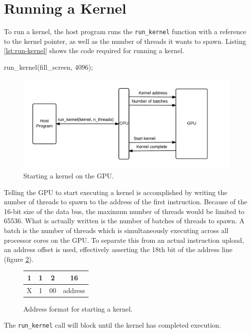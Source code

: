 \section{Running a Kernel}
To run a kernel, the host program runs the \verb/run_kernel/ function with a reference to the kernel pointer, as well as the number of threads it wants to spawn.
Listing \ref{lst:run-kernel} shows the code required for running a kernel.

\begin{c-code}[caption=Running a kernel, label=lst:run-kernel]
run_kernel(fill_screen, 4096);
\end{c-code}

\begin{figure}[H]
    \centering
    \includegraphics[width=\textwidth]{../cpu/diagrams/running_a_kernel.png}
    \caption{Starting a kernel on the GPU.}
    \label{fig:running_a_kernel}
\end{figure}

Telling the GPU to start executing a kernel is accomplished by writing the number of threads to spawn to the address of the first instruction.
Because of the 16-bit size of the data bus, the maximum number of threads would be limited to 65536.
What is actually written is the number of batches of threads to spawn.
A batch is the number of threads which is simultaneously executing across all processor cores on the GPU.
To separate this from an actual instruction upload, an address offset is used,
effectively asserting the 18th bit of the address line (figure \ref{fig:start_kernel_format}).

\begin{figure}[H]
    \centering
    \begin{tabular}{|c|c|c|c|}
    \multicolumn{1}{c}{1} & \multicolumn{1}{c}{1} & \multicolumn{1}{c}{2} & \multicolumn{1}{c}{16} \\ \hline
    X & 1 & 00 & address \\ \hline
    \end{tabular}
    \caption{Address format for starting a kernel.}
    \label{fig:start_kernel_format}
\end{figure}

The \verb/run_kernel/ call will block until the kernel has completed execution.

